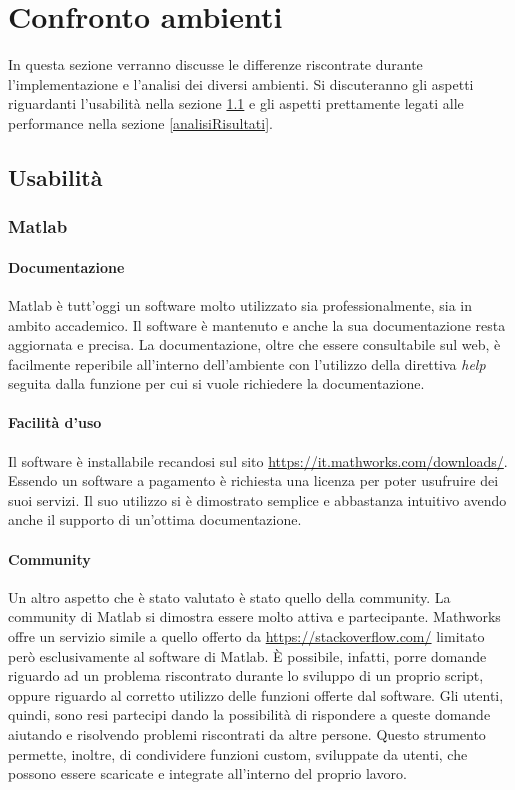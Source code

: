 \section{Confronto ambienti}\label{confrontoAmbienti}
In questa sezione verranno discusse le differenze riscontrate durante l'implementazione e l'analisi dei diversi ambienti.
Si discuteranno gli aspetti riguardanti l'usabilità nella sezione \ref{usabilita} e gli aspetti prettamente legati alle performance
nella sezione \ref{analisiRisultati}.

\subsection {Usabilità}\label{usabilita}

\subsubsection{Matlab}
\paragraph{Documentazione}
Matlab è tutt'oggi un software molto utilizzato sia professionalmente, sia in ambito accademico. Il software è mantenuto e anche la sua documentazione
resta aggiornata e precisa. La documentazione, oltre che essere consultabile sul web, è facilmente reperibile all'interno dell'ambiente con l'utilizzo
della direttiva \emph{help} seguita dalla funzione per cui si vuole richiedere la documentazione.
\paragraph{Facilità d'uso}
Il software è installabile recandosi sul sito \url{https://it.mathworks.com/downloads/}. Essendo un software a pagamento è richiesta una licenza per poter usufruire dei %
suoi servizi. Il suo utilizzo si è dimostrato semplice e abbastanza intuitivo avendo anche il supporto di un'ottima documentazione.
\paragraph{Community}
Un altro aspetto che è stato valutato è stato quello della community. La community di Matlab si dimostra essere molto
attiva e partecipante. Mathworks offre un servizio simile a quello offerto da \url{https://stackoverflow.com/} limitato però
esclusivamente al software di Matlab. È possibile, infatti, porre domande riguardo ad un problema riscontrato durante lo sviluppo
di un proprio script, oppure riguardo al corretto utilizzo delle funzioni offerte dal software. Gli utenti, quindi, sono resi partecipi dando
la possibilità di rispondere a queste domande aiutando e risolvendo problemi riscontrati da altre persone.
Questo strumento permette, inoltre, di condividere funzioni custom, sviluppate da utenti, che possono essere scaricate e integrate all'interno del proprio lavoro.
